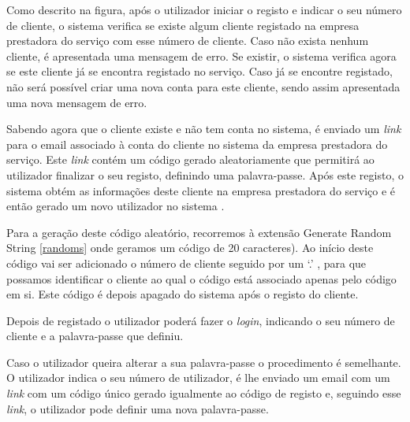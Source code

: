 Como descrito na figura, após o utilizador iniciar o registo e indicar o seu número de cliente, o sistema verifica se existe algum cliente registado na empresa prestadora do serviço com esse número de cliente. Caso não exista nenhum cliente, é apresentada uma mensagem de erro. Se existir, o sistema verifica agora se este cliente já se encontra registado no serviço. Caso já se encontre registado, não será possível criar uma nova conta para este cliente, sendo assim apresentada uma nova mensagem de erro.\par
Sabendo agora que o cliente existe e não tem conta no sistema, é enviado um \textit{link} para o email associado à conta do cliente no sistema da empresa prestadora do serviço. Este \textit{link} contém um código gerado aleatoriamente que permitirá ao utilizador finalizar o seu registo, definindo uma palavra-passe. Após este registo, o sistema obtém as informações deste cliente na empresa prestadora do serviço e é então gerado um novo utilizador no sistema .\par
Para a geração deste código aleatório, recorremos à extensão Generate Random String \ref{randoms} onde geramos um código de 20 caracteres). Ao início deste código vai ser adicionado o número de cliente seguido por um ‘.’ , para que possamos identificar o cliente ao qual o código está associado apenas pelo código em si. Este código é depois apagado do sistema após o registo do cliente.\par
Depois de registado o utilizador poderá fazer o \textit{login}, indicando o seu número de cliente e a palavra-passe que definiu. \par
Caso o utilizador queira alterar a sua palavra-passe o procedimento é semelhante. O utilizador indica o seu número de utilizador, é lhe enviado um email com um \textit{link} com um código único gerado igualmente ao código de registo e, seguindo esse \textit{link}, o utilizador pode definir uma nova palavra-passe.

